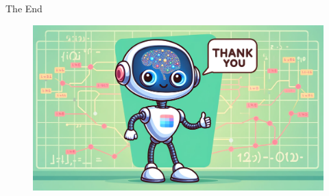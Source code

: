\begin{frame}{The End}
    \begin{figure}[htbp]
        \centering
        \includegraphics[width=\textwidth]{../img/thank-you.png}
    \end{figure}
\end{frame}